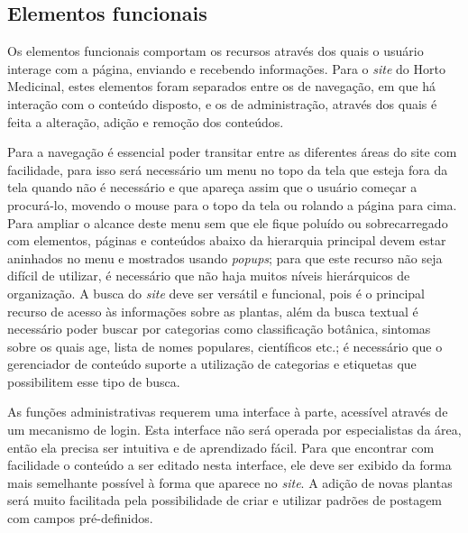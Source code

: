 \subsection{Elementos funcionais}\label{elementos-funcionais}

Os elementos funcionais comportam os recursos através dos quais o usuário interage com a página, enviando e recebendo informações. Para o \emph{site} do Horto Medicinal, estes elementos foram separados entre os de navegação, em que há interação com o conteúdo disposto, e os de administração, através dos quais é feita a alteração, adição e remoção dos conteúdos.

Para a navegação é essencial poder transitar entre as diferentes áreas do site com facilidade, para isso será necessário um menu no topo da tela que esteja fora da tela quando não é necessário e que apareça assim que o usuário começar a procurá-lo, movendo o mouse para o topo da tela ou rolando a página para cima. Para ampliar o alcance deste menu sem que ele fique poluído ou sobrecarregado com elementos, páginas e conteúdos abaixo da hierarquia principal devem estar aninhados no menu e mostrados usando \emph{popups}; para que este recurso não seja difícil de utilizar, é necessário que não haja muitos níveis hierárquicos de organização. A busca do \emph{site} deve ser versátil e funcional, pois é o principal recurso de acesso às informações sobre as plantas, além da busca textual é necessário poder buscar por categorias como classificação botânica, sintomas sobre os quais age, lista de nomes populares, científicos etc.; é necessário que o gerenciador de conteúdo suporte a utilização de categorias e etiquetas que possibilitem esse tipo de busca.

As funções administrativas requerem uma interface à parte, acessível através de um mecanismo de login. Esta interface não será operada por especialistas da área, então ela precisa ser intuitiva e de aprendizado fácil. Para que encontrar com facilidade o conteúdo a ser editado nesta interface, ele deve ser exibido da forma mais semelhante possível à forma que aparece no \emph{site}. A adição de novas plantas será muito facilitada pela possibilidade de criar e utilizar padrões de postagem com campos pré-definidos.

